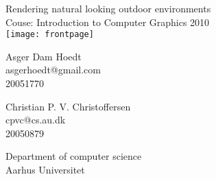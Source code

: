 \documentclass[a4paper,english]{report}
\begin{document}
\begin{titlepage}

\thispagestyle{empty}
\centering
{ \baselineskip=24pt
    \vspace*{80pt}
    {\LARGE Rendering natural looking outdoor environments}\\
    Couse: Introduction to Computer Graphics 2010
    \vspace*{20pt}
    \\
    \texttt{[image: frontpage]}
    \vspace*{40pt}
    \\
    \begin{minipage}{0.4\textwidth}
      \centering
      Asger Dam Hoedt \\ asgerhoedt@gmail.com \\ 20051770
    \end{minipage}
    \begin{minipage}{0.4\textwidth}
      \centering
      Christian P. V. Christoffersen \\ cpvc@cs.au.dk \\ 20050879
    \end{minipage}
}
\vfill
\small
Department of computer science\\
Aarhus Universitet
\end{titlepage}

\clearpage{}
\tableofcontents

\clearpage{}

















\appendix



\end{document}

